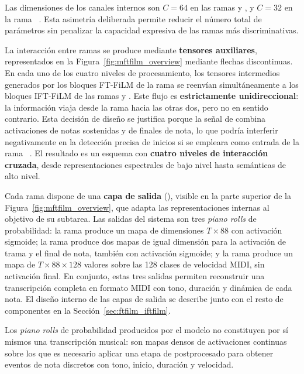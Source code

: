 \documentclass[11pt,spanish,listoffigures,listoftables]{tfgetsinf}
\begin{document}
Las dimensiones de los canales internos son $C = 64$ en las ramas 
 y , y $C = 32$ en la rama 
~\cite{wang2025mftfilm}. Esta asimetría deliberada 
permite reducir el número total de parámetros sin penalizar la capacidad expresiva 
de las ramas más discriminativas.


La interacción entre ramas se produce mediante \textbf{tensores auxiliares}, 
representados en la Figura~\ref{fig:mftfilm_overview} mediante flechas 
discontinuas. En cada uno de los cuatro niveles de procesamiento, los tensores 
intermedios generados por los bloques FT-FiLM de la rama  
se reenvían simultáneamente a los bloques IFT-FiLM de las ramas 
 y . Este flujo es 
\textbf{estrictamente unidireccional}: la información viaja desde la rama 
 hacia las otras dos, pero no en sentido contrario. 
Esta decisión de diseño se justifica porque la señal de  
combina activaciones de notas sostenidas y de finales de nota, lo que podría 
interferir negativamente en la detección precisa de inicios si se empleara como 
entrada de la rama ~\cite{wang2025mftfilm}. El resultado 
es un esquema con \textbf{cuatro niveles de interacción cruzada}, desde 
representaciones espectrales de bajo nivel hasta semánticas de alto nivel.


Cada rama dispone de una \textbf{capa de salida} (), 
visible en la parte superior de la Figura~\ref{fig:mftfilm_overview}, que adapta 
las representaciones internas al objetivo de su subtarea. Las salidas del sistema 
son tres \textit{piano rolls} de probabilidad: la rama  
produce un mapa de dimensiones $T \times 88$ con activación sigmoide; la rama 
 produce dos mapas de igual dimensión para la 
activación de trama y el final de nota, también con activación sigmoide; y la rama 
 produce un mapa de $T \times 88 \times 128$ valores 
sobre las 128 clases de velocidad MIDI, sin activación final. En conjunto, estas 
tres salidas permiten reconstruir una transcripción completa en formato MIDI con 
tono, duración y dinámica de cada nota. El diseño interno de las capas de salida 
se describe junto con el resto de componentes en la 
Sección~\ref{sec:ftfilm_iftfilm}.

Los \textit{piano rolls} de probabilidad producidos por el modelo no constituyen 
por sí mismos una transcripción musical: son mapas densos de activaciones continuas 
sobre los que es necesario aplicar una etapa de postprocesado para obtener eventos 
de nota discretos con tono, inicio, duración y velocidad.
\end{document}

